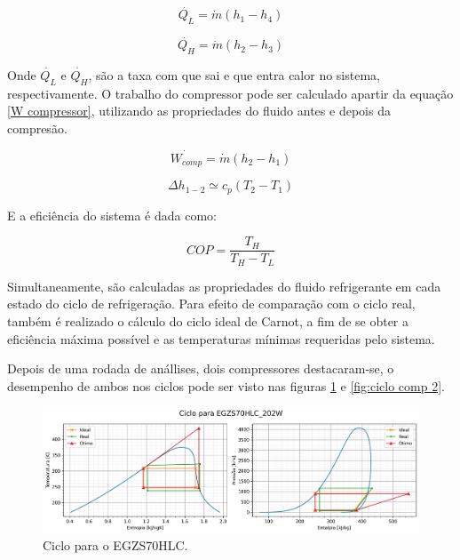 \begin{equation}
    \dot{Q_L} = \dot{m}(h_1-h_4)
    \label{QL}
\end{equation}

\begin{equation}
    \dot{Q_H} = \dot{m}(h_2-h_3)
    \label{QH}
\end{equation}

    Onde $\dot{Q_L}$ e $\dot{Q_H}$, são  a taxa com que sai e que entra calor no sistema, respectivamente. O trabalho do compressor pode ser calculado apartir da equação \ref{W compressor}, utilizando as propriedades do fluido antes e depois da compresão.

\begin{equation}
    \dot{W_{comp}} = \dot{m}(h_2-h_1)
    \label{W compressor}
\end{equation}

\begin{equation}
    \Delta h_{1-2} \simeq  c_p (T_2-T_1)
    \label{simplificacao entalpia}
\end{equation}

    E a eficiência do sistema é dada como:

\begin{equation}
    COP = \frac{T_H}{T_H - T_L}
    \label{COP carnot}
\end{equation}

\newpage    

Simultaneamente, são calculadas as propriedades do fluido refrigerante em cada estado do ciclo de refrigeração. Para efeito de comparação com o ciclo real, também é realizado o cálculo do ciclo ideal de Carnot, a fim de se obter a eficiência máxima possível e as temperaturas mínimas requeridas pelo sistema.

Depois de uma rodada de anállises, dois compressores destacaram-se, o desempenho de ambos nos ciclos pode ser visto nas figuras \ref{fig:ciclo comp 1} e \ref{fig:ciclo comp 2}.

\begin{figure}[ht]
    \centering
    \includegraphics[width=0.9\linewidth]{Imagens/Desenvolvimento/ciclo_EGZS70HLC_202W.png}
    \caption{Ciclo para o EGZS70HLC.}
    \label{fig:ciclo comp 1}
\end{figure}

